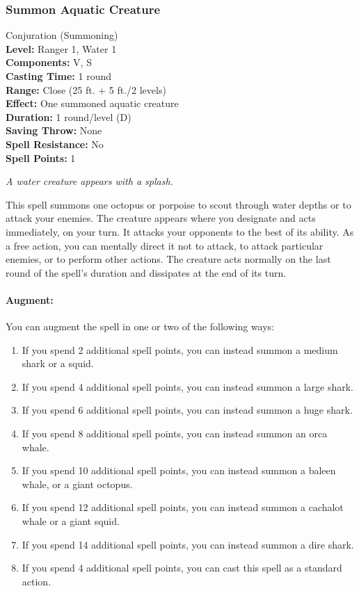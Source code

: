 \subsubsection{Summon Aquatic Creature}
\label{Spell:SummonAquaticCreature}
Conjuration (Summoning)
\\ \textbf{Level:} Ranger 1, Water 1
\\ \textbf{Components:} V, S
\\ \textbf{Casting Time:} 1 round
\\ \textbf{Range:} Close (25 ft. + 5 ft./2 levels)
\\ \textbf{Effect:} One summoned aquatic creature
\\ \textbf{Duration:} 1 round/level (D)
\\ \textbf{Saving Throw:} None
\\ \textbf{Spell Resistance:} No
\\ \textbf{Spell Points:} 1

\emph{A water creature appears with a splash.}

This spell summons one octopus or porpoise to scout through water depths or to attack your enemies.
The creature appears where you designate and acts immediately, on your turn. 
It attacks your opponents to the best of its ability. 
As a free action, you can mentally direct it not to attack, to attack particular enemies, or to perform other actions. 
The creature acts normally on the last round of the spell's duration and dissipates at the end of its turn.

\paragraph{Augment:} You can augment the spell in one or two of the following ways: 
\begin{enumerate}
 \item If you spend 2 additional spell points, you can instead summon a medium shark or a squid.
 \item If you spend 4 additional spell points, you can instead summon a large shark.
 \item If you spend 6 additional spell points, you can instead summon a huge shark.
 \item If you spend 8 additional spell points, you can instead summon an orca whale.
 \item If you spend 10 additional spell points, you can instead summon a baleen whale, or a giant octopus.
 \item If you spend 12 additional spell points, you can instead summon a cachalot whale or a giant squid.
 \item If you spend 14 additional spell points, you can instead summon a dire shark.
 \item If you spend 4 additional spell points, you can cast this spell as a standard action.
\end{enumerate}
